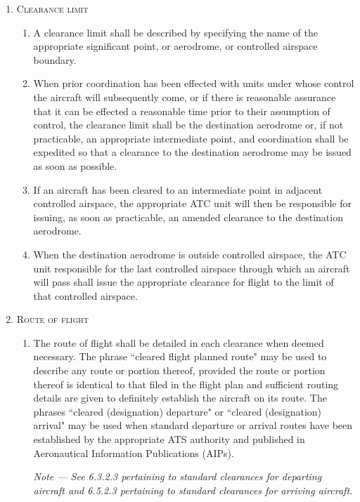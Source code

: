 \documentclass[../main.tex]{subfiles}
\begin{document}
    \begin{enumerate}[itemsep=0.2cm]\centering
        \item \textsc{Clearance limit}
        \begin{enumerate}
            \item A clearance limit shall be described by specifying the name of the appropriate significant point, or aerodrome, or controlled airspace boundary.
            \item When prior coordination has been effected with units under whose control the aircraft will subsequently come, or if there is reasonable assurance that it can be effected a reasonable time prior to their assumption of control, the clearance limit shall be the destination aerodrome or, if not practicable, an appropriate intermediate point, and coordination shall be expedited so that a clearance to the destination aerodrome may be issued as soon as possible.
            \item If an aircraft has been cleared to an intermediate point in adjacent controlled airspace, the appropriate ATC unit will then be responsible for issuing, as soon as practicable, an amended clearance to the destination aerodrome.
            \item When the destination aerodrome is outside controlled airspace, the ATC unit responsible for the last controlled airspace through which an aircraft will pass shall issue the appropriate clearance for flight to the limit of that controlled airspace.
        \end{enumerate}

        \item \textsc{Route of flight}
        \begin{enumerate}
            \item The route of flight shall be detailed in each clearance when deemed necessary. The phrase ``cleared flight planned route" may be used to describe any route or portion thereof, provided the route or portion thereof is identical to that filed in the flight plan and sufficient routing details are given to definitely establish the aircraft on its route. The phrases ``cleared (designation) departure" or ``cleared (designation) arrival" may be used when standard departure or arrival routes have been established by the appropriate ATS authority and published in Aeronautical Information Publications (AIPs).

            \textit{Note --- See 6.3.2.3 pertaining to standard clearances for departing aircraft and 6.5.2.3 pertaining to standard clearances for arriving aircraft.}


\end{enumerate}
\end{enumerate}
\end{document}
